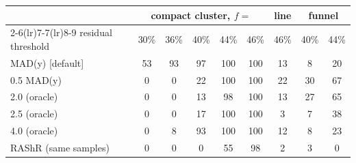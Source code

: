 \begin{tabular}{@{}l ccccc c cc@{}}
\toprule
& \multicolumn{5}{c}{compact cluster, $f=$} & line & \multicolumn{2}{c}{funnel}\\
\cmidrule(lr){2-6}\cmidrule(lr){7-7}\cmidrule(lr){8-9}
residual threshold & 30\% & 36\% & 40\% & 44\% & 46\% & 46\% & 40\% & 44\%\\
\midrule
MAD(y) [default] & 53 & 93 & 97 & 100 & 100 & 13 & 8 & 20 \\
0.5 MAD(y) & 0 & 0 & 22 & 100 & 100 & 22 & 30 & 67 \\
2.0 (oracle) & 0 & 0 & 13 & 98 & 100 & 13 & 27 & 65 \\
2.5 (oracle) & 0 & 0 & 17 & 100 & 100 & 3 & 7 & 38 \\
4.0 (oracle) & 0 & 8 & 93 & 100 & 100 & 12 & 8 & 23 \\
\midrule
RAShR (same samples) & 0 & 0 & 0 & 55 & 98 & 2 & 3 & 0 \\
\bottomrule
\end{tabular}
